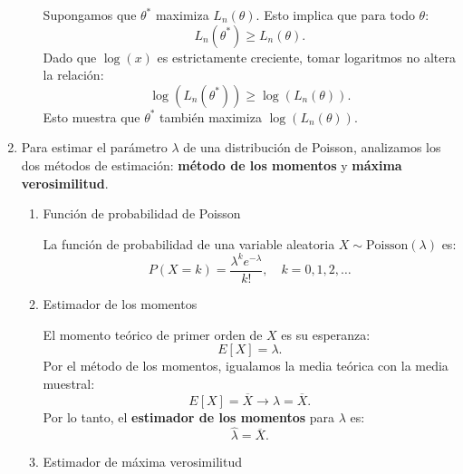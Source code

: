\begin{enumerate}[label=\color{red}\textbf{\arabic*)}]
\begin{enumerate}[label=\arabic*)]
                Supongamos que $\theta^*$ maximiza $L_n(\theta)$. Esto implica que para todo $\theta$: \[
                L_n(\theta^*)\ge L_n(\theta).
                \] 
                Dado que $\log(x)$ es estrictamente creciente, tomar logaritmos no altera la relación: \[
                \log(L_n(\theta^*))\ge \log(L_n(\theta)).
                \] 
                Esto muestra que $\theta^*$ también maximiza $\log(L_n(\theta))$.
        \end{enumerate}
    \item {}

        Para estimar el parámetro $\lambda$ de una distribución de Poisson, analizamos los dos métodos de estimación: \textbf{método de los momentos} y \textbf{máxima verosimilitud}.
        \begin{enumerate}[label=\arabic*)]
            \item Función de probabilidad de Poisson

                La función de probabilidad de una variable aleatoria $X\sim \mathrm{Poisson}(\lambda)$ es: \[
                P(X=k)=\dfrac{\lambda^{k}e^{-\lambda} }{k!},\quad k=0,1,2,\dots
                \] 
            \item Estimador de los momentos

                El momento teórico de primer orden de $X$ es su esperanza: \[
                    E[X]=\lambda.
                \] 
                Por el método de los momentos, igualamos la media teórica con la media muestral: \[
                    E[X]=\overline{X}\longrightarrow \lambda=\overline{X}.
                \] 
                Por lo tanto, el \textbf{estimador de los momentos} para $\lambda$ es: \[
                \hat{\lambda}=\overline{X}.
                \] 
            \item Estimador de máxima verosimilitud


\end{enumerate}
\end{enumerate}
